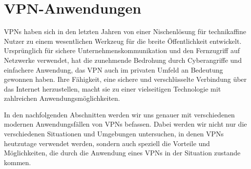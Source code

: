 \chapter{\gls{VPN}-Anwendungen} \label{vpn-anwendungen}

\gls{VPN}s haben sich in den letzten Jahren von einer Nischenlösung für technikaffine Nutzer zu einem wesentlichen Werkzeug für die breite Öffentlichkeit entwickelt. Ursprünglich für sichere Unternehmenskommunikation und den Fernzugriff auf Netzwerke verwendet, hat die zunehmende Bedrohung durch Cyberangriffe und einfachere Anwendung, das \gls{VPN} auch im privaten Umfeld an Bedeutung gewonnen haben. \cite{VPN_People_Survey} Ihre Fähigkeit, eine sichere und verschlüsselte Verbindung über das Internet herzustellen, macht sie zu einer vielseitigen Technologie mit zahlreichen Anwendungsmöglichkeiten.

In den nachfolgenden Abschnitten werden wir uns genauer mit verschiedenen modernen Anwendungsfällen von \gls{VPN}s befassen. Dabei werden wir nicht nur die verschiedenen Situationen und Umgebungen untersuchen, in denen \gls{VPN}s heutzutage verwendet werden, sondern auch speziell die Vorteile und Möglichkeiten, die durch die Anwendung eines \gls{VPN}s in der Situation zustande kommen.